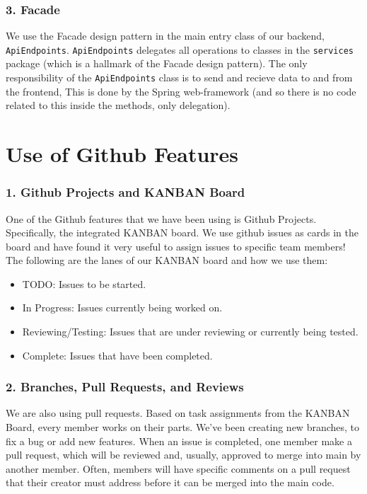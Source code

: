\documentclass[fontsize=14pt]{article}
\def\code#1{\texttt{#1}}
\begin{document}
\subsubsection*{3. Facade}
We use the Facade design pattern in the main entry class of our backend, \code{ApiEndpoints}. \code{ApiEndpoints} delegates all operations to classes in the \code{services} package (which is a hallmark of the Facade design pattern). The only responsibility of the \code{ApiEndpoints} class is to send and recieve data to and from the frontend, This is done by the Spring web-framework (and so there is no code related to this inside the methods, only delegation).


\section*{Use of Github Features}

\subsubsection*{1. Github Projects and KANBAN Board}

One of the Github features that we have been using is Github Projects. Specifically, the integrated KANBAN board. We use github issues as cards in the board and have found it very useful to assign issues to specific team members! The following are the lanes of our KANBAN board and how we use them:

\bigskip
\bigskip

\begin{itemize}
    \item TODO: Issues to be started.
    \item In Progress: Issues currently being worked on.
    \item Reviewing/Testing: Issues that are under reviewing or currently being tested.
    \item Complete: Issues that have been completed.
\end{itemize}

\subsubsection*{2. Branches, Pull Requests, and Reviews}

We are also using pull requests. Based on task assignments from the KANBAN Board, every member works on their parts. We've been creating new branches, to fix a bug or add new features. When an issue is completed, one member make a pull request, which will be reviewed and, usually, approved to merge into main by another member. Often, members will have specific comments on a pull request that their creator must address before it can be merged into the main code.
\end{document}
